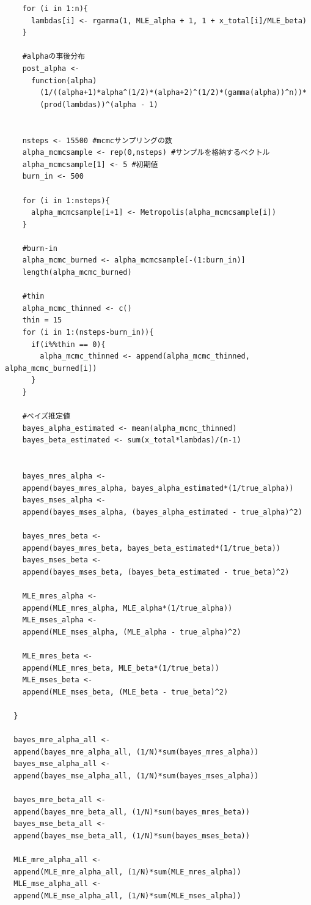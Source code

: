 \documentclass[titlepage,twoside]{jarticle}
\theoremstyle{definition}
\begin{document}
\begin{verbatim}
    for (i in 1:n){
      lambdas[i] <- rgamma(1, MLE_alpha + 1, 1 + x_total[i]/MLE_beta)
    }
    
    #alphaの事後分布
    post_alpha <- 
      function(alpha) 
        (1/((alpha+1)*alpha^(1/2)*(alpha+2)^(1/2)*(gamma(alpha))^n))*
        (prod(lambdas))^(alpha - 1)
    
    
    nsteps <- 15500 #mcmcサンプリングの数
    alpha_mcmcsample <- rep(0,nsteps) #サンプルを格納するベクトル
    alpha_mcmcsample[1] <- 5 #初期値
    burn_in <- 500 
    
    for (i in 1:nsteps){
      alpha_mcmcsample[i+1] <- Metropolis(alpha_mcmcsample[i])
    }
    
    #burn-in
    alpha_mcmc_burned <- alpha_mcmcsample[-(1:burn_in)]
    length(alpha_mcmc_burned)
    
    #thin
    alpha_mcmc_thinned <- c()
    thin = 15
    for (i in 1:(nsteps-burn_in)){
      if(i%%thin == 0){
        alpha_mcmc_thinned <- append(alpha_mcmc_thinned, alpha_mcmc_burned[i])
      }
    }
    
    #ベイズ推定値
    bayes_alpha_estimated <- mean(alpha_mcmc_thinned)
    bayes_beta_estimated <- sum(x_total*lambdas)/(n-1)

    
    bayes_mres_alpha <- 
    append(bayes_mres_alpha, bayes_alpha_estimated*(1/true_alpha))
    bayes_mses_alpha <- 
    append(bayes_mses_alpha, (bayes_alpha_estimated - true_alpha)^2)
    
    bayes_mres_beta <- 
    append(bayes_mres_beta, bayes_beta_estimated*(1/true_beta))
    bayes_mses_beta <- 
    append(bayes_mses_beta, (bayes_beta_estimated - true_beta)^2)
    
    MLE_mres_alpha <- 
    append(MLE_mres_alpha, MLE_alpha*(1/true_alpha))
    MLE_mses_alpha <- 
    append(MLE_mses_alpha, (MLE_alpha - true_alpha)^2)
    
    MLE_mres_beta <- 
    append(MLE_mres_beta, MLE_beta*(1/true_beta))
    MLE_mses_beta <- 
    append(MLE_mses_beta, (MLE_beta - true_beta)^2)
    
  }
  
  bayes_mre_alpha_all <- 
  append(bayes_mre_alpha_all, (1/N)*sum(bayes_mres_alpha))
  bayes_mse_alpha_all <- 
  append(bayes_mse_alpha_all, (1/N)*sum(bayes_mses_alpha))
  
  bayes_mre_beta_all <- 
  append(bayes_mre_beta_all, (1/N)*sum(bayes_mres_beta))
  bayes_mse_beta_all <- 
  append(bayes_mse_beta_all, (1/N)*sum(bayes_mses_beta))
  
  MLE_mre_alpha_all <- 
  append(MLE_mre_alpha_all, (1/N)*sum(MLE_mres_alpha))
  MLE_mse_alpha_all <- 
  append(MLE_mse_alpha_all, (1/N)*sum(MLE_mses_alpha))
  

\end{verbatim}
\end{document}
